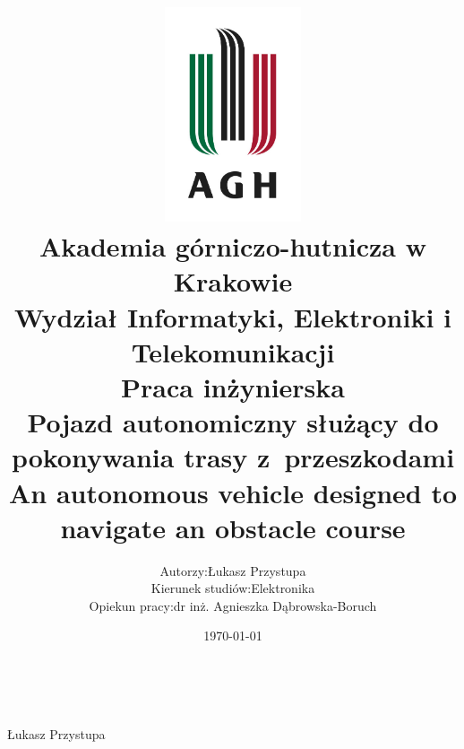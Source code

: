 \documentclass[12pt]{article}
\title{
    \includegraphics[width = 0.3\textwidth]{agh_logo.jpg}\\
    \textbf{Akademia górniczo-hutnicza w Krakowie}\\
    Wydział Informatyki, Elektroniki i  Telekomunikacji\\\vspace{2cm}
    \textbf{Praca inżynierska}\\
    Pojazd autonomiczny służący do pokonywania trasy z~przeszkodami\\\vspace{1cm}
    \small{An autonomous vehicle designed to navigate an obstacle course}
}
\author{
    \begin{tabularx}{\textwidth}{l l}
    Autorzy: &Łukasz Przystupa\\
    Kierunek studiów: & Elektronika\\
    Opiekun pracy: &dr inż. Agnieszka Dąbrowska-Boruch
    \end{tabularx}
}
\date{\vspace{2cm}\today}
\numberwithin{equation}{section}
\begin{document}
    \begin{titlepage}
        \maketitle
        \thispagestyle{empty}
        \newpage
        \ 
        \thispagestyle{empty}
    \end{titlepage}
    
        
        \tableofcontents
        \newpage
    
    
    
    
    
    

    \vfill
    \begin{flushright}
        Łukasz Przystupa
    \end{flushright}

    \newpage
    \nocite{*}
    \printbibliography
\end{document}
